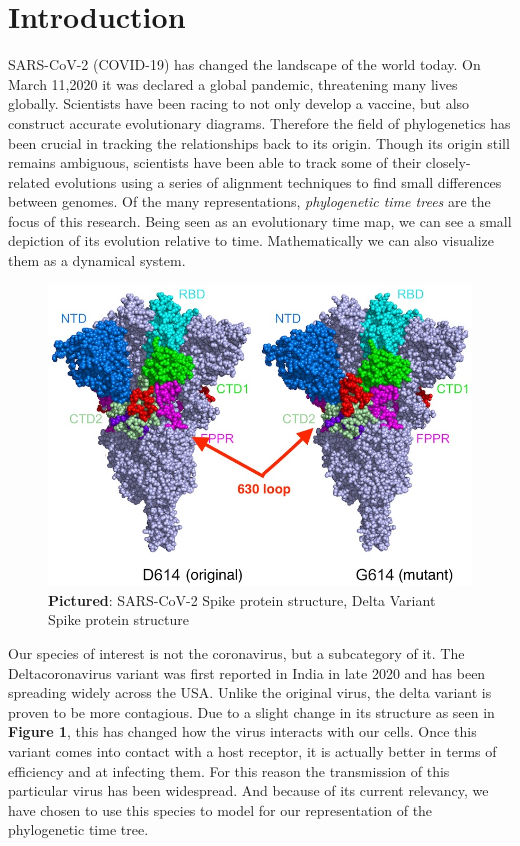 \section{Introduction}
\label{sec:introduction}

SARS-CoV-2 (COVID-19) has changed the landscape of the world today. 
On March 11,2020 it was declared a global pandemic, threatening many lives globally. Scientists have been racing to not only develop a vaccine, but also construct accurate evolutionary diagrams. 
Therefore the field of phylogenetics has been crucial in tracking the relationships back to its origin. 
Though its origin still remains ambiguous, scientists have been able to track some of their closely-related evolutions using a series of alignment techniques to find small differences between genomes. 
Of the many representations, \emph{phylogenetic time trees} are the focus of this research. 
Being seen as an evolutionary time map, we can see a small depiction of its evolution relative to time. 
Mathematically we can also visualize them as a dynamical system. 

\begin{figure}[h]
\centering
\includegraphics[width=.45\textwidth]{figures/Cov2.jpg}
\caption{\textbf{Pictured}: SARS-CoV-2 Spike protein structure, Delta Variant Spike protein structure \cite{Fliesler}}
\end{figure}

Our species of interest is not the coronavirus, but a subcategory of it. 
The Deltacoronavirus variant was first reported in India in late 2020 and has been spreading widely across the USA. 
Unlike the original virus, the delta variant is proven to be more contagious. 
Due to a slight change in its structure as seen in \textbf{Figure 1}, this has changed how the virus interacts with our cells. 
Once this variant comes into contact with a host receptor, it is actually better in terms of efficiency and at infecting them. 
For this reason the transmission of this particular virus has been widespread. 
And because of its current relevancy, we have chosen to use this species to model for our representation of the phylogenetic time tree.        

